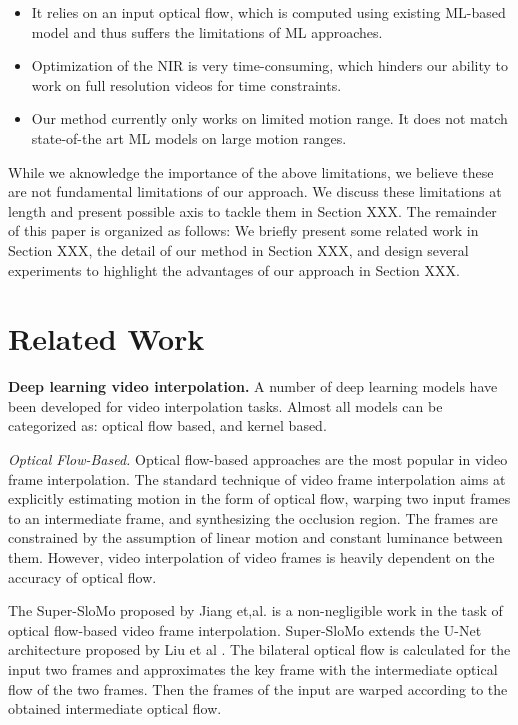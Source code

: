 \documentclass{article}
\begin{document}
\begin{itemize}
\item It relies on an input optical flow, which is computed using existing ML-based model and thus suffers the limitations of ML approaches.
\item Optimization of the NIR is very time-consuming, which hinders our ability to work on full resolution videos for time constraints.
\item Our method currently only works on limited motion range. It does not match state-of-the art ML models on large motion ranges.
\end{itemize}

While we aknowledge the importance of the above limitations, 
we believe these are not fundamental limitations of our approach.
We discuss these limitations at length and present possible axis to tackle them in Section XXX.
The remainder of this paper is organized as follows:
We briefly present some related work in Section XXX, the detail of our method in Section XXX,
and design several experiments to highlight the advantages of our approach in Section XXX.

\section{Related Work}

\textbf{Deep learning video interpolation.}
A number of deep learning models have been developed for video interpolation tasks.
Almost all models can be categorized as: optical flow based, and kernel based.

\textit{Optical Flow-Based.}
Optical flow-based approaches are the most popular in video frame interpolation.
The standard technique of video frame interpolation aims at explicitly estimating motion in the form of optical flow, warping two input frames to an intermediate frame, and synthesizing the occlusion region. The frames are constrained by the assumption of linear motion and constant luminance between them.
However, video interpolation of video frames is heavily dependent on the accuracy of optical flow.


The Super-SloMo \cite{jiang2018super} proposed by Jiang et,al. is a non-negligible work in the task of optical flow-based video frame interpolation.
Super-SloMo extends the U-Net architecture proposed by Liu et al \cite{liu2017video}.
The bilateral optical flow is calculated for the input two frames and approximates the key frame with the intermediate optical flow of the two frames.
Then the frames of the input are warped according to the obtained intermediate optical flow.
\end{document}
